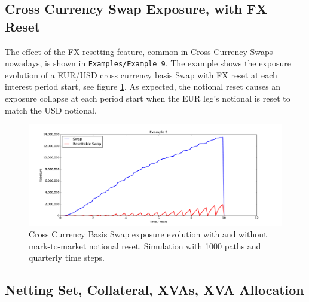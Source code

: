 \documentclass[12pt, a4paper]{article}
\begin{document}
\subsection{Cross Currency Swap Exposure, with FX Reset}

The effect of the FX resetting feature, common in Cross Currency Swaps nowadays, is shown in {\tt Examples/Example\_9}.
The example shows the exposure evolution of a EUR/USD cross currency basis Swap with FX reset at each interest period
start, see figure \ref{fig_6b}. As expected, the notional reset causes an exposure collapse at each period start when
the EUR leg's notional is reset to match the USD notional.
\begin{figure}[h!]
\begin{center}
\includegraphics[scale=0.45]{mpl_xccy_reset.pdf}
\end{center}
\caption{Cross Currency Basis Swap exposure evolution with and without mark-to-market notional reset. Simulation with
  1000 paths and quarterly time steps.}
\label{fig_6b}
\end{figure}
  
\subsection{Netting Set, Collateral, XVAs, XVA Allocation}
\end{document}
